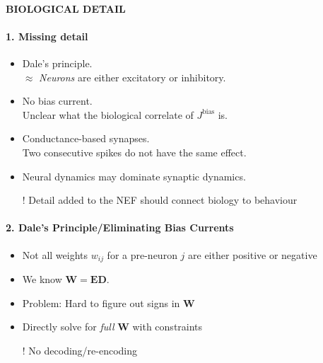 \documentclass[10pt,letterpaper]{article}
\author{Andreas Stöckel}
\newcommand{\mat}[1]{\mathbf{#1}}
\begin{document}
\paragraph{BIOLOGICAL DETAIL}

\paragraph{1. Missing detail}
\begin{itemize}
	\item Dale's principle.\\$\approx$ \emph{Neurons} are either excitatory or inhibitory.
	\item No bias current.\\Unclear what the biological correlate of $J^\mathrm{bias}$ is.
	\item Conductance-based synapses.\\Two consecutive spikes do not have the same effect.
	\item Neural dynamics may dominate synaptic dynamics.
	\item[!] Detail added to the NEF should connect biology to behaviour
\end{itemize}

\paragraph{2. Dale's Principle/Eliminating Bias Currents}
\begin{itemize}
	\item Not all weights $w_{ij}$ for a pre-neuron $j$ are either positive or negative
	\item We know $\mat W = \mat E \mat D$.
	\item Problem: Hard to figure out signs in $\mat W$
	\item Directly solve for \emph{full} $\mat W$ with constraints
	\item[!] No decoding/re-encoding
\end{itemize}
\end{document}
